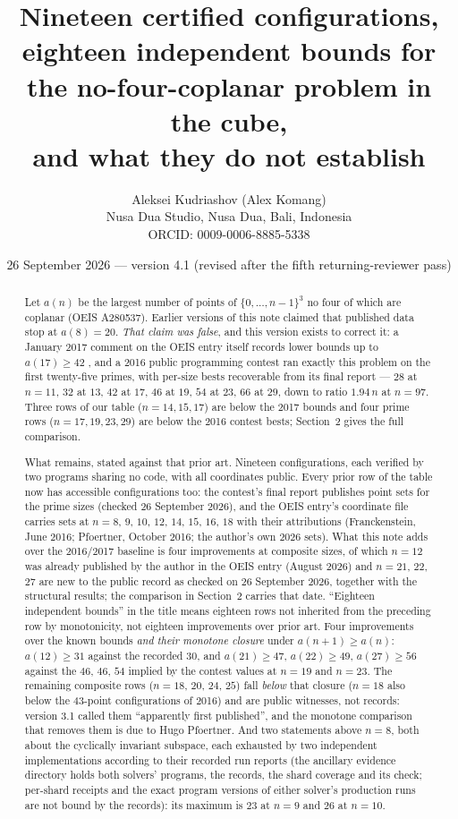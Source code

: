 \documentclass[11pt,a4paper]{article}
\title{Nineteen certified configurations, eighteen independent bounds for the no-four-coplanar problem in the cube,\\
and what they do not establish}
\author{Aleksei Kudriashov (Alex Komang)\\ \small Nusa Dua Studio, Nusa Dua, Bali, Indonesia\\ \small ORCID: 0009-0006-8885-5338}
\date{26 September 2026 --- version 4.1 (revised after the fifth returning-reviewer pass)}
\begin{document}
\maketitle
\begin{abstract}
Let $a(n)$ be the largest number of points of $\{0,\dots,n-1\}^3$ no four of which are coplanar
(OEIS A280537).  Earlier versions of this note claimed that published data stop at $a(8)=20$.
\emph{That claim was false}, and this version exists to correct it: a January 2017 comment on
the OEIS entry itself records lower bounds up to $a(17)\ge42$ \cite{OEISA280537}, and a 2016
public programming contest ran exactly this problem on the first twenty-five primes, with
per-size bests recoverable from its final report \cite{AZsPCs} --- $28$ at $n=11$, $32$ at $13$,
$42$ at $17$, $46$ at $19$, $54$ at $23$, $66$ at $29$, down to ratio $1.94\,n$ at $n=97$.
Three rows of our table ($n=14,15,17$) are below the 2017 bounds and four prime rows
($n=17,19,23,29$) are below the 2016 contest bests; Section~2 gives the full comparison.

What remains, stated against that prior art.  Nineteen configurations, each verified by two
programs sharing no code, with all coordinates public.  Every prior row of the table now has
accessible configurations too: the contest's final report publishes point sets for the prime sizes
(checked 26 September 2026), and the OEIS entry's coordinate file carries sets at $n=8$, $9$, $10$, $12$,
$14$, $15$, $16$, $18$ with their attributions (Franckenstein, June 2016; Pfoertner, October 2016; the
author's own 2026 sets).  What this note adds over the 2016/2017 baseline is four improvements at composite
sizes, of which $n=12$ was already published by the author in the OEIS entry (August 2026) and $n=21$, $22$, $27$
are new to the public record as checked on 26 September 2026, together with the structural results; the
comparison in Section~2 carries that date.  ``Eighteen independent bounds'' in the title means eighteen rows not inherited from
the preceding row by monotonicity, not eighteen improvements over prior art.  Four improvements over the known bounds \emph{and their monotone
closure} under $a(n+1)\ge a(n)$: $a(12)\ge31$ against the recorded $30$, and $a(21)\ge47$,
$a(22)\ge49$, $a(27)\ge56$ against the $46$, $46$, $54$ implied by the contest values at $n=19$
and $n=23$.  The remaining composite rows ($n=18$, $20$, $24$, $25$) fall \emph{below} that
closure ($n=18$ also below the $43$-point configurations of 2016) and are public witnesses, not records: version 3.1 called them ``apparently first
published'', and the monotone comparison that removes them is due to Hugo Pfoertner.  And two
statements above $n=8$, both about the cyclically invariant subspace, each exhausted by two
independent implementations according to their recorded run reports (the ancillary evidence
directory holds both solvers' programs, the records, the shard coverage and its check; per-shard
receipts and the exact program versions of either solver's production runs are not bound by the
records): its maximum is $23$ at $n=9$ and $26$ at $n=10$.


\end{abstract}
\end{document}
